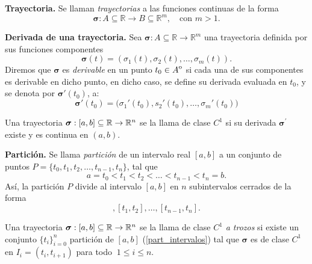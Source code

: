 \begin{definition}\label{def:trayectoria} {\textbf{Trayectoria.}}
  Se llaman \emph{trayectorias} a las funciones continuas de la forma \[ \boldsymbol{\sigma}:A\subseteq\mathbb{R}\rightarrow B\subseteq\mathbb{R}^m , \quad \text{con } m > 1 .\]    
\end{definition}

\begin{definition}{\textbf{Derivada de una trayectoria.}} 
\label{def:derivada_trayectoria}
Sea $\boldsymbol{\sigma} \colon A \subseteq \mathbb{R} \to \mathbb{R}^m$ una trayectoria definida por sus funciones componentes $$\boldsymbol{\sigma}(t) = (\sigma_1(t), \sigma_2(t), \dots, \sigma_m(t)).$$ Diremos que $\boldsymbol{\sigma}$ es \textit{derivable} en un punto $t_0 \in {\kern0ptA}^{\mathrm{o}}$ si cada una de sus componentes  es derivable en dicho punto, en dicho caso, se define su derivada evaluada en $t_0$, y se denota por $\boldsymbol{\sigma}'(t_0)$,  a:
\[ 
\boldsymbol{\sigma}'(t_0) = \big(\sigma_1'(t_0), s_2'(t_0), \dots, \sigma_m'(t_0)\big) 
\]
\end{definition}   

 \begin{definition}\label{def:a}
 Una trayectoria $\boldsymbol{\sigma}:[a,b]\subseteq\mathbb{R}\to\mathbb{R}^n$ se la llama de clase $C^1$  si su derivada $\boldsymbol{\sigma}^{\prime}$ existe y es continua en $(a,b)$. 
\end{definition}     
     
\begin{definition}\label{part_intervalos}{\textbf{Partición.}}
Se llama \textit{partición} de un intervalo real $[a,b]$ a un conjunto de puntos 
$P = \{t_0, t_1, t_2, \dots, t_{n-1}, t_n\}$, tal que 
\begin{equation*} 
a = t_0 < t_1 < t_2 < \dots < t_{n-1} < t_n = b. 
\end{equation*} 
Así, la partición $P$ divide al intervalo $[a,b]$ en $n$ subintervalos cerrados de la forma 
\begin{equation*} 
[t_0, t_1], [t_1, t_2], \dots, [t_{n-1}, t_n]. 
\end{equation*} 
\end{definition}



 \begin{definition}\label{def:a-trozos}
 Una trayectoria $\boldsymbol{\sigma}:[a,b]\subseteq\mathbb{R}\to\mathbb{R}^n$ se la llama de clase $C^1$ \emph{a trozos} si existe un conjunto $\{t_i\}_{i=0}^n$ partici\'on de $[a,b]$  (\ref{part_intervalos}) tal que $\boldsymbol{\sigma}$ es de clase $C^{1}$ en $I_i=(t_i, t_{i+1})$ para todo $\:1\leq i \leq n$.
\end{definition}
   

